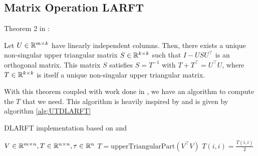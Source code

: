 \documentclass[12pt]{article}
\begin{document}
    \subsection{Matrix Operation LARFT}
    \begin{theorem}\label{thm:Puglisi}
        Theorem 2 in \cite{Joff}:

        Let $U\in\mathbb{R}^{m\times k}$ have linearly independent columns. Then, there exists
        a unique non-singular upper triangular matrix $S\in\mathbb{R}^{k\times k}$ such that
        $I-USU^\top$ is an orthogonal matrix. This matrix $S$ satisfies $S=T^{-1}$ with
        $T+T^\top = U^\top U$, where $T\in\mathbb{R}^{k\times k}$ is itself a unique non-singular upper 
        triangular matrix.
    \end{theorem}
    With this theorem coupled with work done in \cite{Puglisi}, we have an algorithm to compute the $T$ that 
    we need. This algorithm is heavily inspired by \cite{Joff} and is given by algorithm \ref{alg:UTDLARFT}

    \begin{algorithm}
        \caption{DLARFT implementation based on \cite{Joff} and \cite{Puglisi}}\label{alg:UTDLARFT}
        \begin{algorithmic}[1]
            \REQUIRE $V\in\mathbb{R}^{m\times n}, T\in\mathbb{R}^{n\times n}, \tau\in\mathbb{R}^n$\hfill{}
            \STATE $T = \text{upperTriangularPart}\left(V^\top V\right)$
                \STATE $T(i,i) = \frac{T(i,i)}{2}$
            \ENDFOR
        \end{algorithmic}
    \end{algorithm}
\end{document}
